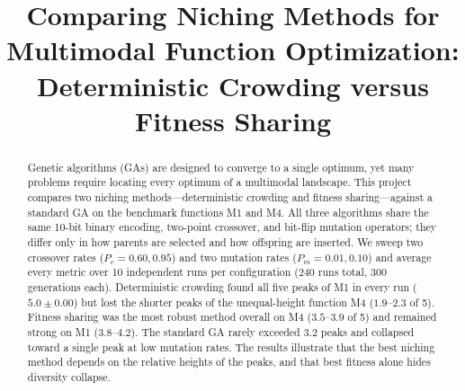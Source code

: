 \documentclass[conference]{IEEEtran}
\begin{document}
\title{Comparing Niching Methods for Multimodal Function Optimization:\\
Deterministic Crowding versus Fitness Sharing}


\author{
\and
{}

}

\maketitle

\begin{abstract}
Genetic algorithms (GAs) are designed to converge to a single optimum, yet many
problems require locating every optimum of a multimodal landscape. This project
compares two niching methods---deterministic crowding and fitness
sharing---against a standard GA on the benchmark functions M1 and M4. All three
algorithms share the same 10-bit binary encoding, two-point crossover, and
bit-flip mutation operators; they differ only in how parents are selected and
how offspring are inserted. We sweep two crossover rates ($P_c = 0.60, 0.95$)
and two mutation rates ($P_m = 0.01, 0.10$) and average every metric over 10
independent runs per configuration (240 runs total, 300 generations each).
Deterministic crowding found all five peaks of M1 in every run
($5.0 \pm 0.00$) but lost the shorter peaks of the unequal-height function M4
($1.9$--$2.3$ of 5). Fitness sharing was the most robust method overall on M4
($3.5$--$3.9$ of 5) and remained strong on M1 ($3.8$--$4.2$). The standard GA
rarely exceeded $3.2$ peaks and collapsed toward a single peak at low mutation
rates. The results illustrate that the best niching method depends on the
relative heights of the peaks, and that best fitness alone hides diversity
collapse.
\end{abstract}
\end{document}
